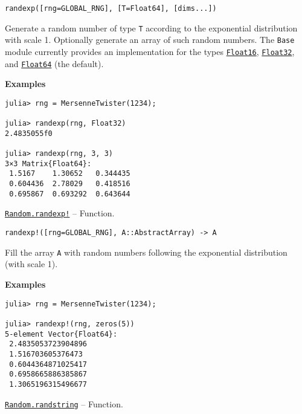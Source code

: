 \begin{adjustwidth}{2em}{0pt}


\begin{verbatim}
randexp([rng=GLOBAL_RNG], [T=Float64], [dims...])
\end{verbatim}

Generate a random number of type \texttt{T} according to the exponential distribution with scale 1. Optionally generate an array of such random numbers. The \texttt{Base} module currently provides an implementation for the types \hyperlink{2727296760866702904}{\texttt{Float16}}, \hyperlink{8101639384272933082}{\texttt{Float32}}, and \hyperlink{5027751419500983000}{\texttt{Float64}} (the default).

\textbf{Examples}


\begin{verbatim}
julia> rng = MersenneTwister(1234);

julia> randexp(rng, Float32)
2.4835055f0

julia> randexp(rng, 3, 3)
3×3 Matrix{Float64}:
 1.5167    1.30652   0.344435
 0.604436  2.78029   0.418516
 0.695867  0.693292  0.643644
\end{verbatim}



\end{adjustwidth}
\hypertarget{3451932378818354751}{}
\hyperlink{3451932378818354751}{\texttt{Random.randexp!}}  -- {Function.}

\begin{adjustwidth}{2em}{0pt}


\begin{verbatim}
randexp!([rng=GLOBAL_RNG], A::AbstractArray) -> A
\end{verbatim}

Fill the array \texttt{A} with random numbers following the exponential distribution (with scale 1).

\textbf{Examples}


\begin{verbatim}
julia> rng = MersenneTwister(1234);

julia> randexp!(rng, zeros(5))
5-element Vector{Float64}:
 2.4835053723904896
 1.516703605376473
 0.6044364871025417
 0.6958665886385867
 1.3065196315496677
\end{verbatim}



\end{adjustwidth}
\hypertarget{3465524779478434258}{}
\hyperlink{3465524779478434258}{\texttt{Random.randstring}}  -- {Function.}

